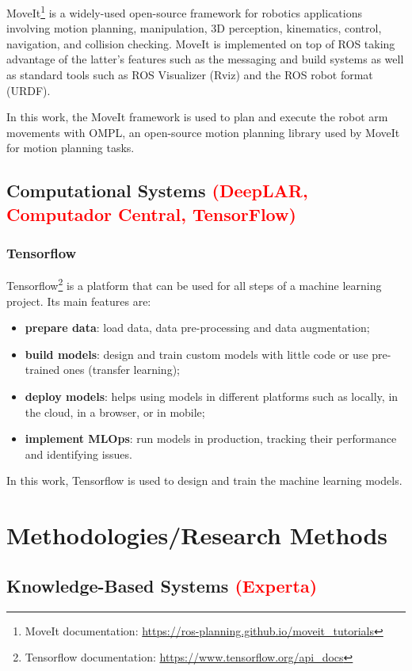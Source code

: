 MoveIt\footnote{MoveIt documentation: \url{https://ros-planning.github.io/moveit_tutorials}} is a widely-used open-source framework for robotics applications involving motion planning, manipulation, 3D perception, kinematics, control, navigation, and collision checking. MoveIt is implemented on top of ROS taking advantage of the latter's features such as the messaging and build systems as well as standard tools such as ROS Visualizer (Rviz) and the ROS robot format (URDF).

In this work, the MoveIt framework is used to plan and execute the robot arm movements with OMPL, an open-source motion planning library used by MoveIt for motion planning tasks.

\subsection{Computational Systems \textcolor{red}{(DeepLAR, Computador Central, TensorFlow)}}

\subsubsection{Tensorflow}

Tensorflow\footnote{Tensorflow documentation: \url{https://www.tensorflow.org/api_docs}} is a platform that can be used for all steps of a machine learning project. Its main features are:
\begin{itemize}
    \item \textbf{prepare data}: load data, data pre-processing and data augmentation;
    \item \textbf{build models}: design and train custom models with little code or use pre-trained ones (transfer learning);
    \item \textbf{deploy models}: helps using models in different platforms such as locally, in the cloud, in a browser, or in mobile;
    \item \textbf{implement MLOps}: run models in production, tracking their performance and identifying issues.
\end{itemize}

In this work, Tensorflow is used to design and train the machine learning models.

\section{Methodologies/Research Methods}

\subsection{Knowledge-Based Systems \textcolor{red}{(Experta)}}

